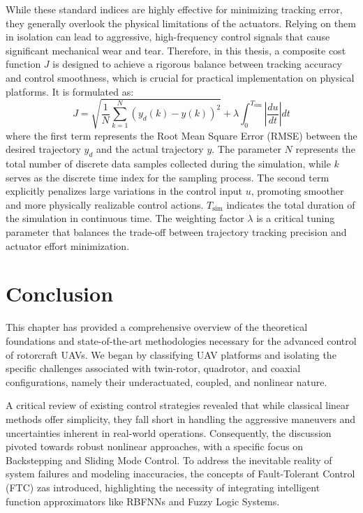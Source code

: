 While these standard indices are highly effective for minimizing tracking error, they generally overlook the physical limitations of the actuators. Relying on them in isolation can lead to aggressive, high-frequency control signals that cause significant mechanical wear and tear. Therefore, in this thesis, a composite cost function $J$ is designed to achieve a rigorous balance between tracking accuracy and control smoothness, which is crucial for practical implementation on physical platforms. It is formulated as:
\begin{equation}
    J = \sqrt{\frac{1}{N} \sum_{k=1}^{N} \left(y_d(k) - y(k)\right)^2} + \lambda \int_{0}^{T_{\text{sim}}} \left| \frac{du}{dt} \right| dt
    \label{eq:cost_function}
\end{equation}
where the first term represents the Root Mean Square Error (RMSE) between the desired trajectory $y_d$ and the actual trajectory $y$. The parameter $N$ represents the total number of discrete data samples collected during the simulation, while $k$ serves as the discrete time index for the sampling process. The second term explicitly penalizes large variations in the control input $u$, promoting smoother and more physically realizable control actions. $T_{\text{sim}}$ indicates the total duration of the simulation in continuous time. The weighting factor $\lambda$ is a critical tuning parameter that balances the trade-off between trajectory tracking precision and actuator effort minimization.



\section{Conclusion}
\label{sec:chap2_conclusion}

This chapter has provided a comprehensive overview of the theoretical foundations and state-of-the-art methodologies necessary for the advanced control of rotorcraft UAVs. We began by classifying UAV platforms and isolating the specific challenges associated with twin-rotor, quadrotor, and coaxial configurations, namely their underactuated, coupled, and nonlinear nature.

A critical review of existing control strategies revealed that while classical linear methods offer simplicity, they fall short in handling the aggressive maneuvers and uncertainties inherent in real-world operations. Consequently, the discussion pivoted towards robust nonlinear approaches, with a specific focus on Backstepping and Sliding Mode Control. To address the inevitable reality of system failures and modeling inaccuracies, the concepts of Fault-Tolerant Control (FTC) zas introduced, highlighting the necessity of integrating intelligent function approximators like RBFNNs and Fuzzy Logic Systems.

